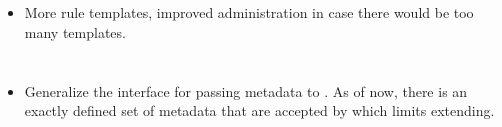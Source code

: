 \section{\DN}
\begin{itemize}
	\item More rule templates, improved administration in case there would be too many templates.
\end{itemize}

\section{\CR}
\begin{itemize}
	\item Generalize the interface for passing metadata to \CR. As of now, there is an exactly defined set of metadata that are accepted by \CR which limits extending.
\end{itemize}




